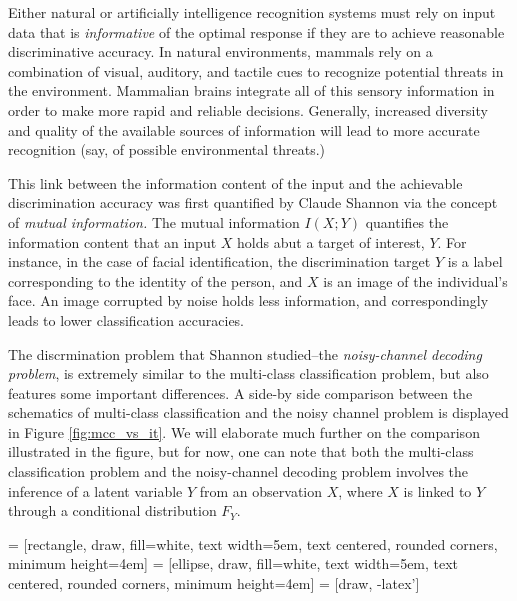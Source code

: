 Either natural or artificially intelligence recognition systems must
rely on input data that is \emph{informative} of the optimal response
if they are to achieve reasonable discriminative accuracy.  In natural
environments, mammals rely on a combination of visual, auditory, and
tactile cues to recognize potential threats in the environment.
Mammalian brains integrate all of this sensory information in order to
make more rapid and reliable decisions.  Generally, increased
diversity and quality of the available sources of information will
lead to more accurate recognition (say, of possible environmental
threats.)

This link between the information content of the input and the
achievable discrimination accuracy was first quantified by Claude
Shannon via the concept of \emph{mutual information.}  The mutual
information $I(X; Y)$ quantifies the information content that an input
$X$ holds abut a target of interest, $Y$.  For instance, in the case
of facial identification, the discrimination target $Y$ is a label
corresponding to the identity of the person, and $X$ is an image of
the individual's face.  An image corrupted by noise holds less
information, and correspondingly leads to lower classification
accuracies.

The discrmination problem that Shannon studied--the
\emph{noisy-channel decoding problem}, is extremely similar to the
multi-class classification problem, but also features some important
differences.  A side-by side comparison between the schematics of
multi-class classification and the noisy channel problem is displayed
in Figure \ref{fig:mcc_vs_it}.  We will elaborate much further on the
comparison illustrated in the figure, but for now, one can note that
both the multi-class classification problem and the noisy-channel
decoding problem involves the inference of a latent variable $Y$ from
an observation $X$, where $X$ is linked to $Y$ through a conditional
distribution $F_Y$.

 = [rectangle, draw, fill=white, 
    text width=5em, text centered, rounded corners, minimum height=4em]
 = [ellipse, draw, fill=white, 
    text width=5em, text centered, rounded corners, minimum height=4em]
 = [draw, -latex']
    
